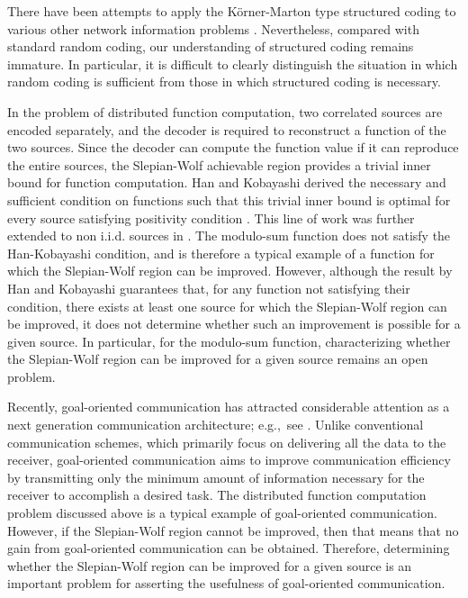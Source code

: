 \documentclass[journal,onecolumn]{IEEEtran}
\theoremstyle{definition}
\theoremstyle{remark}
\begin{document}
There have been attempts to apply the K\"orner-Marton type structured coding to various other network
information problems \cite{NazGas:07,PhiZamEreKhi:11,PraPadShi:monograph}. Nevertheless, compared with standard random coding, our understanding
of structured coding remains immature. In particular, it is difficult to clearly distinguish the situation
in which random coding is sufficient from those in which structured coding is necessary. 


In the problem of distributed function computation, two correlated sources are
encoded separately, and the decoder is required to reconstruct a function of the two sources.
Since the decoder can compute the function value if it can reproduce the entire sources,
the Slepian-Wolf achievable region provides a trivial inner bound for function computation.
Han and Kobayashi derived the necessary and sufficient condition on functions such that
this trivial inner bound is optimal for every source satisfying positivity condition \cite{HK}. 
This line of work was further extended to non i.i.d. sources in \cite{KuzWat15,KuzWat16,Wat20}.
The modulo-sum function does not satisfy the Han-Kobayashi condition, and is therefore a typical example
of a function for which the Slepian-Wolf region can be improved. 
 However, although the result by Han and Kobayashi guarantees that, for any function not satisfying their condition,
 there exists at least one source for which the Slepian-Wolf region can be improved, it does not determine whether 
 such an improvement is possible for a given source. In particular, for the modulo-sum function,
 characterizing whether the Slepian-Wolf region can be improved for a given source remains an open problem. 
 
 Recently, goal-oriented communication has attracted considerable attention as a next generation
 communication architecture; e.g.,~see \cite{Gun+23}. Unlike conventional communication schemes, which
 primarily focus on delivering all the data to the receiver, goal-oriented communication
 aims to improve communication efficiency by transmitting only the minimum amount of information
 necessary for the receiver to accomplish a desired task. The distributed function computation problem
 discussed above is a typical example of goal-oriented communication. However, if the Slepian-Wolf region
 cannot be improved, then that means that no gain from goal-oriented communication can be obtained. 
 Therefore, determining whether the Slepian-Wolf region can be improved for a given source
 is an important problem for asserting the usefulness of goal-oriented communication.
 
\end{document}
